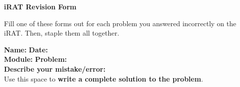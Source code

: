 \documentclass[letterpaper]{article}
\begin{document}
\begin{center}
{\Large \bf iRAT Revision Form} \\
\large \course
\end{center}


Fill one of these forms out for each problem you answered incorrectly on the iRAT.  Then, staple them all together.	
\vspace{0.1in}

\begin{flushleft}
{\bf Name: } \underline{\phantom{xxxxxxxxxxxxxxxxxxxxxxxxxxxxxxxxxxxxxxxxxxxxxx}} \hfill
{\bf Date: } \underline{\phantom{xxxxxxxxxxxxxxxxxxxxxxxx}} \\
\vspace{0.15in}
{\bf Module: } \underline{\phantom{xxxxxxxxxxxxxxxxxxx}} \hfill
{\bf Problem: } \underline{\phantom{xxxxxxxxxxxxxxxxxxxxxxxx}}\\
\vspace{0.15in}
{\bf Describe your mistake/error: } \\
\vspace{0.7in}
Use this space to {\bf write a complete solution to the problem}.  



\end{flushleft}
\end{document}
